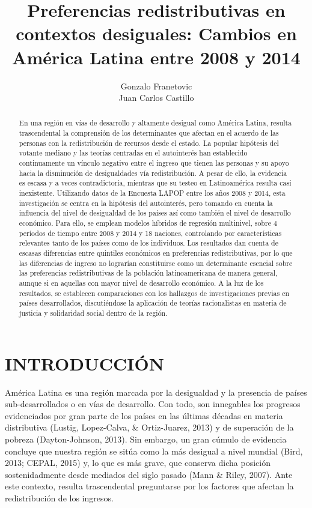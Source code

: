 \documentclass[12pt,letterpaper]{article}
\title{Preferencias redistributivas en contextos desiguales: Cambios en América Latina entre 2008 y 2014}
\author{Gonzalo Franetovic\\ Juan Carlos Castillo}
\begin{document}
\maketitle

\begin{abstract}

En una región en vías de desarrollo y altamente desigual como América Latina, resulta trascendental la comprensión de los determinantes que afectan en el acuerdo de las personas con la redistribución de recursos desde el estado. La popular hipótesis del votante mediano y las teorías centradas en el autointerés han establecido continuamente un vínculo negativo entre el ingreso que tienen las personas y su apoyo hacia la disminución de desigualdades vía redistribución. A pesar de ello, la evidencia es escasa y a veces contradictoria, mientras que su testeo en Latinoamérica resulta casi inexistente. Utilizando datos de la Encuesta LAPOP entre los años 2008 y 2014, esta investigación se centra en la hipótesis del autointerés, pero tomando en cuenta la influencia del nivel de desigualdad de los países así como también el nivel de desarrollo económico. Para ello, se emplean modelos híbridos de regresión multinivel, sobre 4 períodos de tiempo entre 2008 y 2014 y 18 naciones, controlando por características relevantes tanto de los países como de los individuos. Los resultados dan cuenta de escasas diferencias entre quintiles económicos en preferencias redistributivas, por lo que las diferencias de ingreso no lograrían constituirse como un determinante esencial sobre las preferencias redistributivas de la población latinoamericana de manera general, aunque si en aquellas con mayor nivel de desarrollo económico. A la luz de los resultados, se establecen comparaciones con los hallazgos de investigaciones previas en países desarrollados, discutiéndose la aplicación de teorías racionalistas en materia de justicia y solidaridad social dentro de la región.

\end{abstract}

\newpage

\section{INTRODUCCIÓN \label{sec:sec1}}

América Latina es una región marcada por la desigualdad y la presencia de países sub-desarrollados o en vías de desarrollo. Con todo, son innegables los progresos evidenciados por gran parte de los países en las últimas décadas en materia distributiva (Lustig, Lopez-Calva, \& Ortiz-Juarez, 2013) y de superación de la pobreza (Dayton-Johnson, 2013). Sin embargo, un gran cúmulo de evidencia concluye que nuestra región se sitúa como la más desigual a nivel mundial (Bird, 2013; CEPAL, 2015) y, lo que es más grave, que conserva dicha posición sostenidadmente desde mediados del siglo pasado (Mann \& Riley, 2007). Ante este contexto, resulta trascendental preguntarse por los factores que afectan la redistribución de los ingresos.\\
\end{document}
